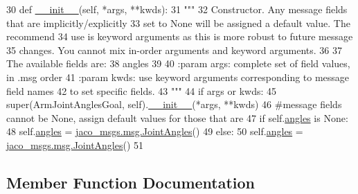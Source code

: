 \begin{DoxyCode}
30   \textcolor{keyword}{def }\hyperlink{classjaco__msgs_1_1msg_1_1__ArmJointAnglesGoal_1_1ArmJointAnglesGoal_a2b03e9f8bd7fa46de03afdb1ab8d6cf3}{\_\_init\_\_}(self, *args, **kwds):
31     \textcolor{stringliteral}{"""}
32 \textcolor{stringliteral}{    Constructor. Any message fields that are implicitly/explicitly}
33 \textcolor{stringliteral}{    set to None will be assigned a default value. The recommend}
34 \textcolor{stringliteral}{    use is keyword arguments as this is more robust to future message}
35 \textcolor{stringliteral}{    changes.  You cannot mix in-order arguments and keyword arguments.}
36 \textcolor{stringliteral}{}
37 \textcolor{stringliteral}{    The available fields are:}
38 \textcolor{stringliteral}{       angles}
39 \textcolor{stringliteral}{}
40 \textcolor{stringliteral}{    :param args: complete set of field values, in .msg order}
41 \textcolor{stringliteral}{    :param kwds: use keyword arguments corresponding to message field names}
42 \textcolor{stringliteral}{    to set specific fields.}
43 \textcolor{stringliteral}{    """}
44     \textcolor{keywordflow}{if} args \textcolor{keywordflow}{or} kwds:
45       super(ArmJointAnglesGoal, self).\hyperlink{classjaco__msgs_1_1msg_1_1__ArmJointAnglesGoal_1_1ArmJointAnglesGoal_a2b03e9f8bd7fa46de03afdb1ab8d6cf3}{\_\_init\_\_}(*args, **kwds)
46       \textcolor{comment}{#message fields cannot be None, assign default values for those that are}
47       \textcolor{keywordflow}{if} self.\hyperlink{classjaco__msgs_1_1msg_1_1__ArmJointAnglesGoal_1_1ArmJointAnglesGoal_a1627be30233ae9ff8861c8cc8fbd9566}{angles} \textcolor{keywordflow}{is} \textcolor{keywordtype}{None}:
48         self.\hyperlink{classjaco__msgs_1_1msg_1_1__ArmJointAnglesGoal_1_1ArmJointAnglesGoal_a1627be30233ae9ff8861c8cc8fbd9566}{angles} = \hyperlink{classjaco__msgs_1_1msg_1_1__JointAngles_1_1JointAngles}{jaco\_msgs.msg.JointAngles}()
49     \textcolor{keywordflow}{else}:
50       self.\hyperlink{classjaco__msgs_1_1msg_1_1__ArmJointAnglesGoal_1_1ArmJointAnglesGoal_a1627be30233ae9ff8861c8cc8fbd9566}{angles} = \hyperlink{classjaco__msgs_1_1msg_1_1__JointAngles_1_1JointAngles}{jaco\_msgs.msg.JointAngles}()
51 
\end{DoxyCode}


\subsection{Member Function Documentation}
